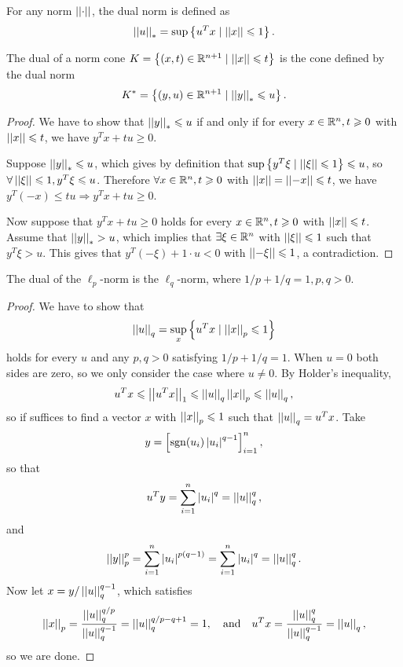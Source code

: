 \documentclass[12pt]{article}
\begin{document}
\begin{definition}
    For any norm \(\left|\left|\cdot\right|\right|\), the \textnormal{dual norm} is defined as
    \[\left|\left|u\right|\right|_\ast=\sup\left\{u^Tx\mid\left|\left|x\right|\right|\leqslant 1\right\}.\]
\end{definition}

\begin{proposition}
    The dual of a norm cone \(K=\left\{(x,t)\in\mathbb R^{n+1}\mid\left|\left|x\right|\right|\leqslant t\right\}\) is the cone defined by the dual norm
    \[K^\ast=\left\{(y,u)\in\mathbb R^{n+1}\mid\left|\left|y\right|\right|_\ast\leqslant u\right\}.\]
\end{proposition}
\begin{proof}
    We have to show that \(\left|\left|y\right|\right|_\ast\leqslant u\) if and only if for every \(x\in\mathbb R^n,t\geqslant 0\) with \(\left|\left|x\right|\right|\leqslant t\), we have \(y^Tx+tu\geqslant 0\).\par
    Suppose \(\left|\left|y\right|\right|_\ast\leqslant u\), which gives by definition that \(\sup\left\{y^T\xi\mid\left|\left|\xi\right|\right|\leqslant 1\right\}\leqslant u\), so \(\forall\left|\left|\xi\right|\right|\leqslant 1,y^T\xi\leqslant u\). Therefore \(\forall x\in\mathbb R^n,t\geqslant 0\) with \(\left|\left|x\right|\right|=\left|\left|-x\right|\right|\leqslant t\), we have \(y^T(-x)\leqslant tu\Rightarrow y^Tx+tu\geqslant 0\).\par
    Now suppose that \(y^Tx+tu\geqslant 0\) holds for every \(x\in\mathbb R^n,t\geqslant 0\) with \(\left|\left|x\right|\right|\leqslant t\). Assume that \(\left|\left|y\right|\right|_\ast>u\), which implies that \(\exists\xi\in\mathbb R^n\) with \(\left|\left|\xi\right|\right|\leqslant 1\) such that \(y^T\xi>u\). This gives that \(y^T(-\xi)+1\cdot u<0\) with \(\left|\left|-\xi\right|\right|\leqslant 1\), a contradiction.
\end{proof}

\begin{proposition}
    The dual of the \(\ell_p\)-norm is the \(\ell_q\)-norm, where \(1/p+1/q=1,p,q>0\).
\end{proposition}
\begin{proof}
    We have to show that
    \[\left|\left|u\right|\right|_q=\sup_x\left\{u^Tx\mid\left|\left|x\right|\right|_p\leqslant 1\right\}\]
    holds for every \(u\) and any \(p,q>0\) satisfying \(1/p+1/q=1\). When \(u=0\) both sides are zero, so we only consider the case where \(u\neq 0\). By Holder's inequality,
    \[u^Tx\leqslant\left|\left|u^Tx\right|\right|_1\leqslant\left|\left|u\right|\right|_q\left|\left|x\right|\right|_p\leqslant\left|\left|u\right|\right|_q,\]
    so if suffices to find a vector \(x\) with \(\left|\left|x\right|\right|_p\leqslant 1\) such that \(\left|\left|u\right|\right|_q=u^Tx\). Take
    \[y=\left[\operatorname{sgn}(u_i)\left|u_i\right|^{q-1}\right]_{i=1}^n,\]
    so that 
    \[u^Ty=\sum_{i=1}^n\left|u_i\right|^q=\left|\left|u\right|\right|_q^q,\]
    and
    \[\left|\left|y\right|\right|_p^p=\sum_{i=1}^n\left|u_i\right|^{p(q-1)}=\sum_{i=1}^n\left|u_i\right|^q=\left|\left|u\right|\right|_q^q.\]
    Now let \(x=y/\left|\left|u\right|\right|_q^{q-1}\), which satisfies
    \[\left|\left|x\right|\right|_p=\frac{\left|\left|u\right|\right|_q^{q/p}}{\left|\left|u\right|\right|_q^{q-1}}=\left|\left|u\right|\right|_q^{q/p-q+1}=1,\quad\text{and}\quad u^Tx=\frac{\left|\left|u\right|\right|_q^q}{\left|\left|u\right|\right|_q^{q-1}}=\left|\left|u\right|\right|_q,\]
    so we are done.
\end{proof}
\end{document}
